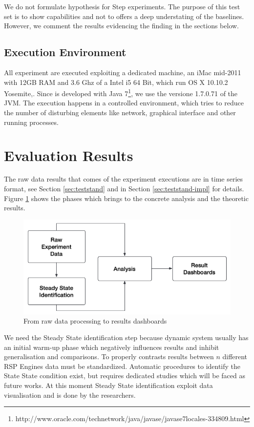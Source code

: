 We do not formulate hypothesis for Step experiments. The purpose of this test set is to show \name capabilities and not to offers a deep understating of the baselines. However, we comment the results evidencing the finding in the sections below.

\subsection{Execution Environment}\label{sec:execution-environment}

All experiment are executed exploiting a dedicated machine, an iMac mid-2011 with 12GB RAM and 3.6 Ghz of a Intel i5 64 Bit, which run OS X 10.10.2 Yosemite,. Since \name is developed with Java 7\footnote{http://www.oracle.com/technetwork/java/javase/javase7locales-334809.html}, we use the versione 1.7.0.71 of the JVM.
The execution happens in a controlled environment, which tries to reduce the number of disturbing elements like network, graphical interface and other running processes.

\section{Evaluation Results}

The raw data results that comes of the experiment executions are in time series format, see Section \ref{sec:teststand} and in Section \ref{sec:teststand-impl} for details. Figure \ref{fig:data-processing} shows the phases which brings to the concrete analysis and the theoretic results. 

\begin{figure}[tbh]
  \centering
	\includegraphics[width=\linewidth]{images/data-processing}
	\caption{From raw data processing to results dashboards} 
  	\label{fig:data-processing}
\end{figure}

We need the Steady State identification step because dynamic system usually has an initial warm-up phase which negatively influences results and inhibit generalisation and comparisons. To properly contrasts results between $n$ different RSP Engines data must be standardized. Automatic procedures to identify the State State condition exist, but requires dedicated studies which will be faced as future works. At this moment Steady State identification exploit data visualisation and is done by the researchers.  

